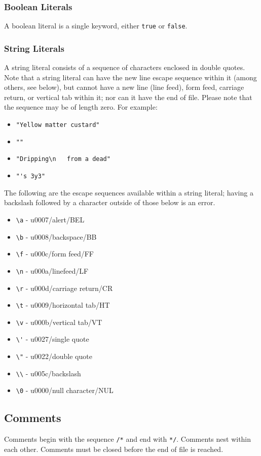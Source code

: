 \subsubsection{Boolean Literals}
A boolean literal is a single keyword, either \verb!true! or \verb!false!.

\subsubsection{String Literals}
A string literal consists of a sequence of characters enclosed in double quotes. Note that a string literal can have the new line escape sequence within it (among others, see below), but cannot have a new line (line feed), form feed, carriage return, or vertical tab within it; nor can it have the end of file. Please note that the sequence may be of length zero. For example:
\begin{itemize}
\item \verb!"Yellow matter custard"!
\item \verb!""!
\item \verb!"Dripping\n   from a dead"!
\item \verb!"'s 3y3"!
\end{itemize}

The following are the escape sequences available within a string literal; having a backslash followed by a character outside of those below is an error.
\begin{itemize}
\item \verb!\a! - u0007/alert/BEL
\item \verb!\b! - u0008/backspace/BB
\item \verb!\f! - u000c/form feed/FF
\item \verb!\n! - u000a/linefeed/LF
\item \verb!\r! - u000d/carriage return/CR
\item \verb!\t! - u0009/horizontal tab/HT
\item \verb!\v! - u000b/vertical tab/VT
\item \verb!\'! - u0027/single quote
\item \verb!\"! - u0022/double quote
\item \verb!\\! - u005c/backslash
\item \verb!\0! - u0000/null character/NUL 
\end{itemize}

\subsection{Comments}
Comments begin with the sequence \verb!/*! and end with \verb!*/!. Comments nest within each other.  Comments must be closed before the end of file is reached.

